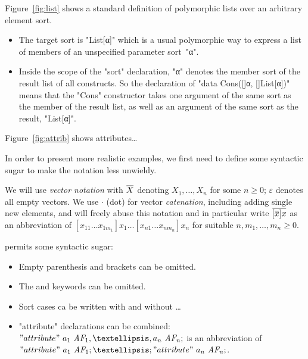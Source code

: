 \documentclass[letterpaper,11pt]{article}
\begin{document}
\begin{example}[lists]\label{ex:list}
  Figure~\ref{fig:list} shows a standard definition of polymorphic lists over an arbitrary element
  sort.
  \begin{itemize}

  \item The target sort is "List[α]" which is a usual polymorphic way to express a list of members
    of an unspecified parameter sort~"α".

  \item Inside the scope of the "sort" declaration, "α" denotes the member sort of the result list
    of all constructs. So the declaration of "data Cons([]α, []List[α])" means that the "Cons"
    constructor takes one argument of the same sort as the member of the result list, as well as an
    argument of the same sort as the result, "List[α]".

  \end{itemize}
\end{example}

\begin{example}[synthesis]\label{ex:attrib}
  Figure~\ref{fig:attrib} shows attributes…
\end{example}

In order to present more realistic examples, we first need to define some syntactic sugar to make
the notation less unwieldy.

\begin{notation}
  We will use \emph{vector notation} with $\ov{X}$ denoting $X_1,…,X_n$ for some $n≥0$; $ε$ denotes
  all empty vectors. We use $·$ (dot) for vector \emph{catenation}, including adding single new
  elements, and will freely abuse this notation and in particular write $\ov{[\ov{x}]x}$ as an
  abbreviation of $[x_{11}…x_{1m_1}]x_1…[x_{n1}…x_{nm_n}]x_n$ for suitable $n,m_1,…,m_n ≥ 0$.
\end{notation}

\begin{notation}
  \HAX permits some syntactic sugar:
  \begin{itemize}

  \item Empty parenthesis and brackets can be omitted.

  \item The  and  keywords can be omitted.

  \item {} Sort cases ca be written with \kw{\texttt{|}} and without
    \kw{\texttt{\{\}}}…

  \item "attribute" declarations can be combined: $"attribute"~a_1~\set{AF}_1,…, a_n~\set{AF}_n ;$
    is an abbreviation of $"attribute"~a_1~\set{AF}_1;…; "attribute"~a_n~\set{AF}_n;$.

  \end{itemize}
\end{notation}
\end{document}
